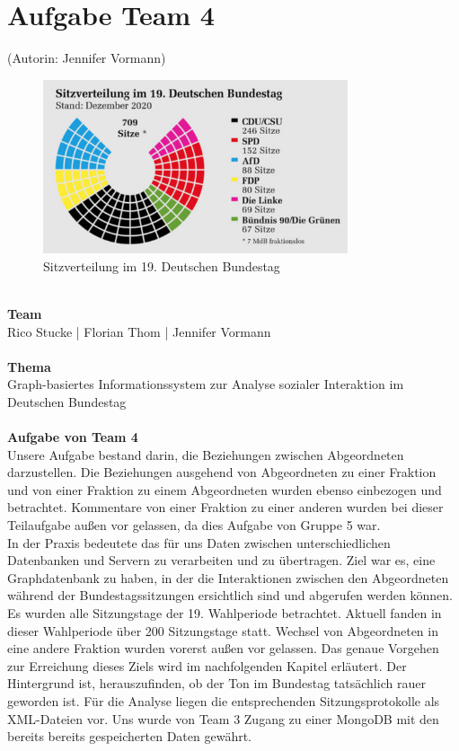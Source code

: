 \section{Aufgabe Team 4}\label{sec:04_01_aufgabe}
(Autorin: Jennifer Vormann)\\
\begin{figure}
  \begin{center}
    \includegraphics[width=0.8\textwidth]{chapters/05-Interaktion-Abgeord/sitzverteilung_19wp_bild.jpg}
  \end{center}
  \caption{Sitzverteilung im 19. Deutschen Bundestag \cite{sitze19Bundestag}}
  \label{fig:sitzverteilung}
\end{figure}
\\
\textbf{Team} \\
Rico Stucke | Florian Thom | Jennifer Vormann\\
\\
\textbf{Thema}\\
Graph-basiertes Informationssystem zur Analyse sozialer Interaktion im Deutschen Bundestag\\
\\
\textbf{Aufgabe von Team 4}\\
Unsere Aufgabe bestand darin, die Beziehungen zwischen Abgeordneten darzustellen. Die Beziehungen ausgehend von Abgeordneten zu einer Fraktion und von einer Fraktion zu einem Abgeordneten wurden ebenso einbezogen und betrachtet. Kommentare von einer Fraktion zu einer anderen wurden bei dieser Teilaufgabe außen vor gelassen, da dies Aufgabe von Gruppe 5 war. \\
In der Praxis bedeutete das für uns Daten zwischen unterschiedlichen Datenbanken und Servern zu verarbeiten und zu übertragen. Ziel war es, eine Graphdatenbank zu haben, in der die Interaktionen zwischen den Abgeordneten während der Bundestagssitzungen ersichtlich sind und abgerufen werden können. Es wurden alle Sitzungstage der 19. Wahlperiode betrachtet. Aktuell fanden in dieser Wahlperiode über 200 Sitzungstage statt. Wechsel von Abgeordneten in eine andere Fraktion wurden vorerst außen vor gelassen. Das genaue Vorgehen zur Erreichung dieses Ziels wird im nachfolgenden Kapitel erläutert. Der Hintergrund ist, herauszufinden, ob der Ton im Bundestag tatsächlich rauer geworden ist. Für die Analyse liegen die entsprechenden Sitzungsprotokolle als XML-Dateien vor. Uns wurde von Team 3 Zugang zu einer MongoDB mit den bereits bereits gespeicherten Daten gewährt.
